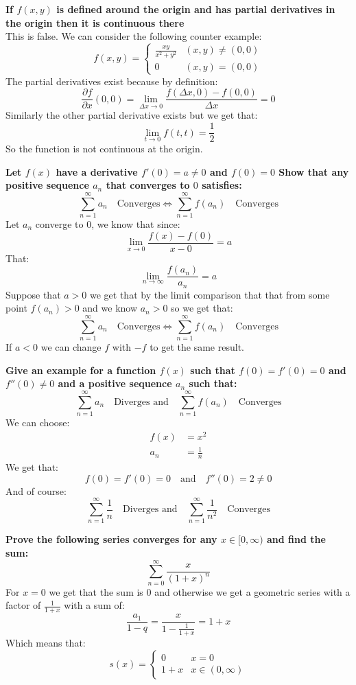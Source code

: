 \documentclass{article}
\theoremstyle{plain}
\begin{document}
	\newpage
	
	\textbf{If $f(x,y)$ is defined around the origin and has partial
	derivatives in the origin then it is continuous there} \\
	This is false. We can consider the following counter example:
	\[
		f(x,y) = \begin{cases}
			\frac{xy}{x^2+y^2} &(x,y) \neq (0,0) \\
			0 &(x,y) = (0,0)
		\end{cases}
	\]
	The partial derivatives exist because by definition:
	\[
		\frac{\partial f}{\partial x}(0,0) = 
		\lim_{\Delta x\to 0}
		\frac{f(\Delta x, 0) - f(0,0)}{\Delta x} = 
		0
	\]
	Similarly the other partial derivative exists but we get that:
	\[
		\lim_{t\to 0}{f(t,t)} = \frac{1}{2}
	\]
	So the function is not continuous at the origin.
	
	\newpage
	
	\textbf{Let $f(x)$ have a derivative $f'(0) = a \neq 0$ and $f(0) = 0$
	Show that any positive sequence $a_n$ that converges to $0$ satisfies:
	\[
		\sum_{n=1}^{\infty}{a_n} \quad \text{Converges} \iff
		\sum_{n=1}^{\infty}{f(a_n)} \quad \text{Converges}
	\]}
	Let $a_n$ converge to $0$, we know that since:
	\[
		\lim_{x\to 0}{\frac{f(x)-f(0)}{x-0}} = a
	\]
	That:
	\[
		\lim_{n\to \infty}{\frac{f(a_n)}{a_n}} = a
	\]
	Suppose that $a > 0$ we get that by the limit comparison that that
	from some point $f(a_n) > 0$ and we know $a_n > 0$ so we get
	that:
	\[
		\sum_{n=1}^{\infty}{a_n} \quad \text{Converges} \iff
		\sum_{n=1}^{\infty}{f(a_n)} \quad \text{Converges}
	\]
	If $a < 0$ we can change $f$ with $-f$ to get the same result.
	
	\newpage
	
	\textbf{Give an example for a function $f(x)$ such that $f(0)=f'(0)=0$
	and $f''(0) \neq 0$ and a positive sequence $a_n$ such that:
	\[
		\sum_{n=1}^{\infty}{a_n} \quad \text{Diverges and} \quad
		\sum_{n=1}^{\infty}{f(a_n)} \quad \text{Converges}
	\]}
	We can choose:
	\begin{align*}
		f(x) &= x^2 \\
		a_n  &= \frac{1}{n}
	\end{align*}
	We get that:
	\[
		f(0)=f'(0)=0
	\quad \text{and} \quad f''(0) = 2 \neq 0
	\]
	And of course:
	\[
		\sum_{n=1}^{\infty}{\frac{1}{n}} \quad \text{Diverges and} \quad
		\sum_{n=1}^{\infty}{\frac{1}{n^2}} \quad \text{Converges}
	\]
	
	\newpage
	
	\textbf{Prove the following series converges for any $x\in[0,\infty)$ and
	find the sum:
	\[
		\sum_{n=0}^{\infty}{\frac{x}{(1+x)^n}}
	\]}
	For $x = 0$ we get that the sum is $0$ and otherwise we get a geometric
	series with a factor of $\frac{1}{1+x}$ with a sum of:
	\[
		\frac{a_1}{1-q} = \frac{x}{1-\frac{1}{1+x}} = 1 + x
	\]
	Which means that:
	\[
		s(x) = \begin{cases}
			0 &x=0 \\
			1+x &x\in(0,\infty)
		\end{cases}
	\]
	
\end{document}
